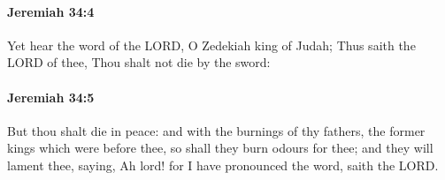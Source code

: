 		\paragraph{Jeremiah 34:4} %
			\label{JEREMIAH-34-4}

			Yet hear the word of the LORD, O Zedekiah king of Judah; Thus saith the LORD of thee, Thou shalt not die by the sword:


		\paragraph{Jeremiah 34:5} %
			\label{JEREMIAH-34-5}

			But thou shalt die in peace: and with the burnings of thy fathers, the former kings which were before thee, so shall they burn odours for thee; and they will lament thee, saying, Ah lord! for I have pronounced the word, saith the LORD.


